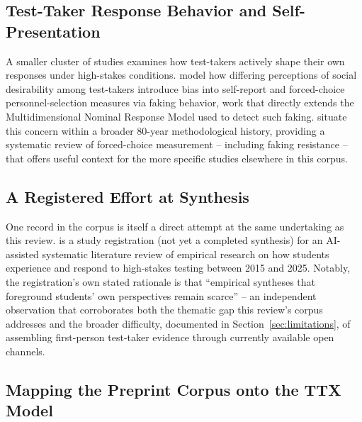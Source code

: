 \documentclass[11pt]{article}
\begin{document}
\subsection{Test-Taker Response Behavior and Self-Presentation}

A smaller cluster of studies examines how test-takers actively shape their own responses under high-stakes conditions. \citet{kleinbub2026socialdesirability} model how differing perceptions of social desirability among test-takers introduce bias into self-report and forced-choice personnel-selection measures via faking behavior, work that directly extends the Multidimensional Nominal Response Model used to detect such faking. \citet{lee2025forcedchoice} situate this concern within a broader 80-year methodological history, providing a systematic review of forced-choice measurement -- including faking resistance -- that offers useful context for the more specific studies elsewhere in this corpus.

\subsection{A Registered Effort at Synthesis}

One record in the corpus is itself a direct attempt at the same undertaking as this review. \citet{kaleta2025studentperspectives} is a study registration (not yet a completed synthesis) for an AI-assisted systematic literature review of empirical research on how students experience and respond to high-stakes testing between 2015 and 2025. Notably, the registration's own stated rationale is that ``empirical syntheses that foreground students' own perspectives remain scarce'' -- an independent observation that corroborates both the thematic gap this review's corpus addresses and the broader difficulty, documented in Section~\ref{sec:limitations}, of assembling first-person test-taker evidence through currently available open channels.

\subsection{Mapping the Preprint Corpus onto the TTX Model}
\label{sec:mapping}
\end{document}
